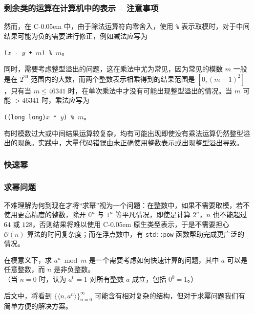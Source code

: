 \documentclass{../pkslide}
\newcommand{\Cpp}{\texorpdfstring{C\kern-0.05em\protect\raisebox{.35ex}{\textsmaller[2]{+\kern-0.05em+}}}{C++}}
\begin{document}
\begin{frame}
  \frametitle{剩余类的运算在计算机中的表示 -- 注意事项}
  然而，在 \Cpp{} 中，由于除法运算符向零舍入，使用 \texttt{\%} 表示取模时，对于中间结果可能为负的需要进行修正，例如减法应写为
  \begin{center}
    \texttt{($x$ - $y$ + $m$) \% $m$}。
  \end{center}
    \pause
  同时，需要考虑整型溢出的问题，这在乘法中尤为常见，因为常见的模数 $m$ 一般是在 $2^{30}$ 范围内的大数，而两个整数表示相乘得到的结果范围是 $[0, {(m - 1)}^2]$，只有当 $m \le 46341$ 时，在单次乘法中才没有可能出现整型溢出的情况。当 $m$ 可能 $> 46341$ 时，乘法应写为
  \begin{center}
    \texttt{((long long)$x$ * $y$) \% $m$}。
  \end{center}
    \pause
  有时模数过大或中间结果运算较复杂，均有可能出现即使没有乘法运算仍然整型溢出的现象。实践中，大量代码错误由未正确使用整数表示或出现整型溢出导致。
\end{frame}

\subsubsection{快速幂}

\begin{frame}
  \frametitle{求幂问题}
  不难理解为何到现在才将“求幂”视为一个问题：在整数中，如果不需要取模，若不使用更高精度的整数，除开 $0^n$ 与 $1^n$ 等平凡情况，即使是计算 $2^n$，$n$ 也不能超过 $64$ 或 $128$，否则结果将难以使用 \Cpp{} 原生类型表示，于是不需要担心 $\mathcal O (n)$ 算法的时间复杂度；而在浮点数中，有 \texttt{std::pow} 函数帮助完成更广泛的情况。
  
  \pause
  \emptyline
  在模意义下，求 $a^n \bmod m$ 是一个需要考虑如何快速计算的问题，其中 $a$ 可以是任意整数，而 $n$ 是非负整数。\\
  （当 $n = 0$ 时，认为 $a^0 = 1$ 对所有整数 $a$ 成立，包括 $0^0 = 1$。）
  
  \pause
  \emptyline
  后文中，将看到 ${\{ \langle n, a^n \rangle \}}_{n = 0}^{\infty}$ 可能含有相对复杂的结构，但对于求幂问题我们有简单方便的解决方案。
\end{frame}
\end{document}

